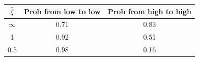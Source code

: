 \begin{tabular}{ccc}
\hline
\rule{0pt}{1.2em}
$\widehat \xi$  &Prob from low to low& Prob from high to high \\
\hline
$\infty$ &  0.71 & 0.83 \\
1   &  0.92 & 0.51  \\
0.5 &  0.98 & 0.16\\



\hline
\end{tabular}
